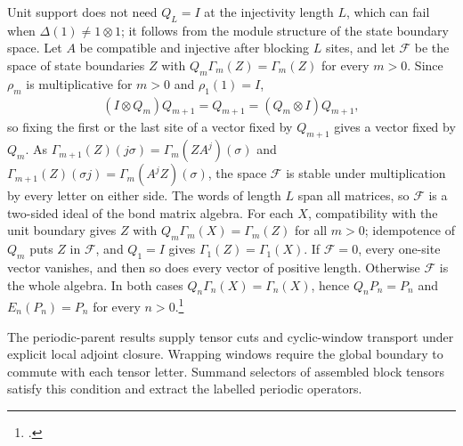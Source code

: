 \documentclass{article}
\begin{document}
Unit support does not need $Q_L=I$ at the injectivity length $L$, which
can fail when $\Delta(1)\ne1\otimes1$; it follows from the module
structure of the state boundary space. Let $A$ be compatible and injective
after blocking $L$ sites, and let $\mathcal F$ be the space of state
boundaries $Z$ with $Q_m\Gamma_m(Z)=\Gamma_m(Z)$ for every $m>0$. Since
$\rho_m$ is multiplicative for $m>0$ and $\rho_1(1)=I$,
\begin{align}
    (I\otimes Q_m)Q_{m+1}=Q_{m+1}=(Q_m\otimes I)Q_{m+1},
    \label{eq:glm23_wha_parent_unit_nesting}
\end{align}
so fixing the first or the last site of a vector fixed by $Q_{m+1}$ gives a
vector fixed by $Q_m$. As
$\Gamma_{m+1}(Z)(j\sigma)=\Gamma_m(ZA^j)(\sigma)$ and
$\Gamma_{m+1}(Z)(\sigma j)=\Gamma_m(A^jZ)(\sigma)$, the space $\mathcal F$
is stable under multiplication by every letter on either side. The words
of length $L$ span all matrices, so $\mathcal F$ is a two-sided ideal of
the bond matrix algebra. For each $X$, compatibility with the unit
boundary gives $Z$ with $Q_m\Gamma_m(X)=\Gamma_m(Z)$ for all $m>0$;
idempotence of $Q_m$ puts $Z$ in $\mathcal F$, and $Q_1=I$ gives
$\Gamma_1(Z)=\Gamma_1(X)$. If $\mathcal F=0$, every one-site vector
vanishes, and then so does every vector of positive length. Otherwise
$\mathcal F$ is the whole algebra. In both cases
$Q_n\Gamma_n(X)=\Gamma_n(X)$, hence $Q_nP_n=P_n$ and $E_n(P_n)=P_n$ for
every $n>0$.\footnote{.}

The periodic-parent results supply tensor cuts and cyclic-window transport
under explicit local adjoint closure. Wrapping windows require the global
boundary to commute with each tensor letter. Summand selectors of assembled
block tensors satisfy this condition and extract the labelled periodic
operators.
\end{document}
